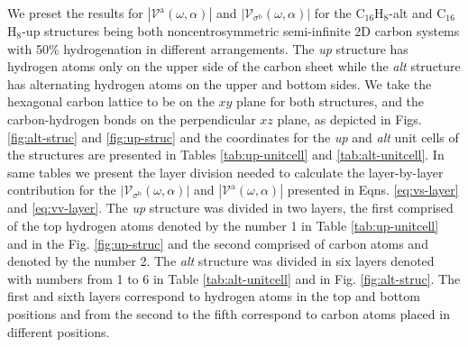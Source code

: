 \documentclass[prb,11pt,tightenlines,twocolumn,aps]{revtex4-1}
\begin{document}
We preset the results for $|\mathcal{V}^{\mathrm{a}}(\omega,\alpha)|$ and
$|\mathcal{V}_{\sigma^{\mathrm{b}}}(\omega,\alpha)|$ for the
C$_{16}$H$_{8}$-alt and C$_{16}$H$_{8}$-up structures being both
noncentrosymmetric semi-infinite 2D carbon systems with 50\% hydrogenation in
different arrangements. The \emph{up} structure has hydrogen atoms only on the
upper side of the carbon sheet while the \emph{alt} structure has alternating
hydrogen atoms on the upper and bottom sides. We take the hexagonal carbon
lattice to be on the $xy$ plane for both structures, and the carbon-hydrogen
bonds on the perpendicular $xz$ plane, as depicted in Figs. \ref{fig:alt-struc}
and \ref{fig:up-struc}
% 
{\color{blue} and the coordinates for the \emph{up} and \emph{alt} unit cells
of the structures are presented in Tables \ref{tab:up-unitcell} and
% 
\ref{tab:alt-unitcell}. In same tables we present the layer division needed to
calculate the layer-by-layer contribution for the
$|\mathcal{V}_{\sigma^{\mathrm{b}}}(\omega,\alpha)|$ and
$|\mathcal{V}^{\mathrm{a}}(\omega,\alpha)|$ presented in Eqns. 
% 
\eqref{eq:vs-layer} and \eqref{eq:vv-layer}. The \emph{up} structure was
divided in two layers, the first comprised of the top hydrogen atoms denoted by
the number 1 in Table \ref{tab:up-unitcell} and in the Fig. \ref{fig:up-struc}
and the second comprised of carbon atoms and denoted by the number 2. The
\emph{alt} structure was divided in six layers denoted with numbers from 1 to 6
in Table \ref{tab:alt-unitcell} and in Fig. \ref{fig:alt-struc}. The first and
sixth layers correspond to hydrogen atoms in the top and bottom positions and
from the second to the fifth correspond to carbon atoms placed in different
positions.}
\end{document}
